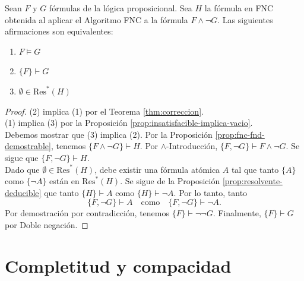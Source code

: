 \message{ !name(main.tex)}\documentclass[12pt,a4paper]{book}
\begin{document}
    \begin{teorema}\label{thm:completitud-finita}
        Sean $F$ y $G$ fórmulas de la lógica proposicional. Sea $H$ la fórmula en FNC obtenida al aplicar el Algoritmo FNC a
        la fórmula $F\wedge\neg G$. Las siguientes afirmaciones son equivalentes:
        \begin{enumerate}
            \item[1.] $F\models G$
            \item[2.] $\{F\}\vdash G$
            \item[3.] $\emptyset\in\mathrm{Res}^{*}(H)$
        \end{enumerate}
    \end{teorema}
    \begin{proof}
        (2) implica (1) por el Teorema \ref{thm:correccion}.\\
        (1) implica (3) por la Proposición \ref{prop:insatisfacible-implica-vacio}.\\
        Debemos mostrar que (3) implica (2). Por la Proposición \ref{prop:fnc-fnd-demostrable}, tenemos
        $\{F\wedge\neg G\}\vdash H$. Por $\wedge$-Introducción, $\{F,\neg G\}\vdash F\wedge\neg G$. Se sigue que
        $\{F,\neg G\}\vdash H$.\\
        Dado que $\emptyset\in\mathrm{Res}^{*}(H)$, debe existir una fórmula atómica $A$ tal que tanto $\{A\}$ como
        $\{\neg A\}$ están en $\mathrm{Res}^{*}(H)$. Se sigue de la Proposición \ref{prop:resolvente-deducible} que tanto
        $\{H\}\vdash A$ como $\{H\}\vdash\neg A$. Por lo tanto, tanto
        \begin{equation*}
            \{F,\neg G\}\vdash A\quad\text{como}\quad\{F,\neg G\}\vdash\neg A.
        \end{equation*}
        Por demostración por contradicción, tenemos $\{F\}\vdash\neg\neg G$. Finalmente, $\{F\}\vdash G$ por Doble negación.
    \end{proof}

    \section{Completitud y compacidad}
\end{document}
